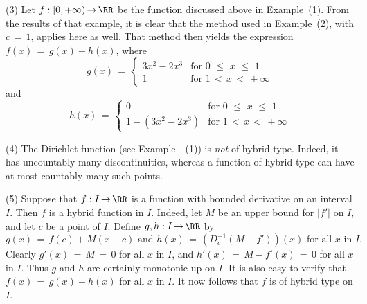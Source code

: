 \V

        (3) Let $f:[0,+{\infty}) \,{\rightarrow}\, {\RR}$ be the function discussed above in Example~(1).
    From the results of that example, it is clear that the method used in Example~(2), with $c \,=\, 1$, applies here as well.
    That method then yields the expression $f(x) \,=\, g(x)-h(x)$, where
        \begin{displaymath}
        g(x) \,=\, 
                    \left\{
        \begin{array}{cl}
        3x^{2}-2x^{3} & \mbox{for $0\,\,{\leq}\,\,x\,\,{\leq}\,\,1$} \\
        1 & \mbox{for $1\,<\,x\,<\,+{\infty}$}
        \end{array}
                    \right.
        \end{displaymath}
    and
        \begin{displaymath}
        h(x) \,=\, 
                    \left\{
        \begin{array}{cl}
         0 & \mbox{for $0\,\,{\leq}\,\,x\,\,{\leq}\,\,1$} \\
        1-(3x^{2}-2x^{3}) & \mbox{for $1\,<\,x\,<\,+{\infty}$}
        \end{array}
                    \right.
        \end{displaymath}

\V

        (4) The Dirichlet function (see Example~~(1)) is {\em not} of hybrid type.
    Indeed, it has uncountably many discontinuities, whereas a function of hybrid type can have at most countably many such points.

\V

        (5) Suppose that $f:I \,{\rightarrow}\, {\RR}$ is a function with bounded derivative on an interval $I$.
    Then $f$ is a hybrid function in $I$. Indeed, let $M$ be an upper bound for $|f'|$ on $I$, and let $c$ be a point of $I$. Define $g,h:I \,{\rightarrow}\, {\RR}$ by
        \begin{displaymath}
        g(x) \,=\, f(c) + M(x-c) \mbox{ and } h(x) \,=\, \left(D^{-1}_{c} (M-f')\right)(x) \mbox{ for all $x$ in $I$}.
        \end{displaymath}
    Clearly $g'(x) \,=\, M \,=\, 0$ for all $x$ in $I$, and $h'(x) \,=\, M-f'(x) \,=\, 0$ for all $x$ in $I$.
    Thus $g$ and $h$ are certainly monotonic up on $I$.
    It is also easy to verify that $f(x) \,=\, g(x) - h(x)$ for all $x$ in $I$. It now follows that $f$ is of hybrid type on $I$.

